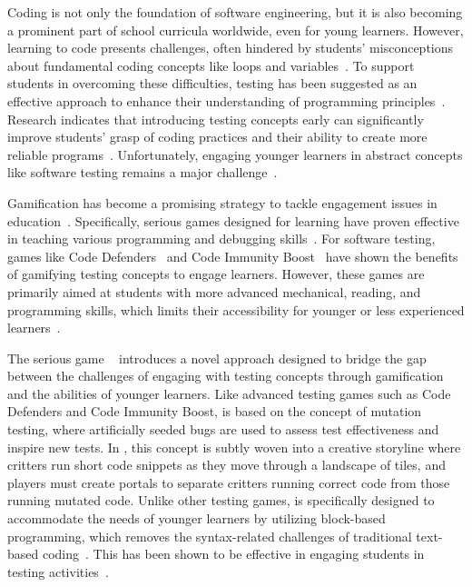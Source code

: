 Coding is not only the foundation of software engineering, but it is also becoming a prominent part of school curricula worldwide, even for young learners. However, learning to code presents challenges, often hindered by students' misconceptions about fundamental coding concepts like loops and variables~\cite{qian2017students,sorva2012visual}. 
%
To support students in overcoming these difficulties, testing has been suggested as an effective approach to enhance their understanding of programming principles~\cite{denny2019closer,prather2018metacognitive,wrenn2019executable,prasad2023conceptual}. Research indicates that introducing testing concepts early can significantly improve students' grasp of coding practices and their ability to create more reliable programs~\cite{DBLP:conf/acse/Carrington97,jones2001experiential,DBLP:conf/iticse/MarreroS05}. 
%
Unfortunately, engaging younger learners in abstract concepts like software testing remains a major challenge~\cite{DBLP:conf/iticse/Luxton-ReillySA18a,DBLP:conf/acse/Carrington97,jones2001experiential,DBLP:conf/iticse/MarreroS05}.

Gamification has become a promising strategy to tackle engagement issues in education~\cite{DBLP:conf/mindtrek/DeterdingDKN11,DBLP:journals/computers/NardoFFMMS24}. Specifically, serious games designed for learning have proven effective in teaching various programming and debugging skills~\cite{DBLP:conf/icer/MiljanovicB17,DBLP:conf/its/MuratetDTV12}. 
%
For software testing, games like Code Defenders~\cite{DBLP:conf/sigcse/FraserGKR19} and Code Immunity Boost~\cite{hsueh2023design} have shown the benefits of gamifying testing concepts to engage learners. However, these games are primarily aimed at students with more advanced mechanical, reading, and programming skills, which limits their accessibility for younger or less experienced learners~\cite{DBLP:journals/jss/GarousiRLA20}.

The serious game \toolname~\cite{DBLP:conf/icst/StraubingerCF23,DBLP:conf/icst/StraubingerBF24} introduces a novel approach designed to bridge the gap between the challenges of engaging with testing concepts through gamification and the abilities of younger learners. Like advanced testing games such as Code Defenders and Code Immunity Boost, \toolname is based on the concept of mutation testing, where artificially seeded bugs are used to assess test effectiveness and inspire new tests. In \toolname, this concept is subtly woven into a creative storyline where critters run short code snippets as they move through a landscape of tiles, and players must create portals to separate critters running correct code from those running mutated code.
%
Unlike other testing games, \toolname is specifically designed to accommodate the needs of younger learners by utilizing block-based programming, which removes the syntax-related challenges of traditional text-based coding~\cite{maloney2010scratch}. This has been shown to be effective in engaging students in testing activities~\cite{DBLP:conf/icst/StraubingerBF24}.

